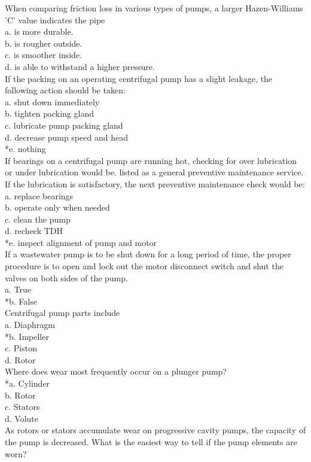 When comparing friction loss in various types of pumps, a larger Hazen-Williams 'C' value indicates the pipe\\
a. is more durable.\\
b. is rougher outside.\\
c. is smoother inside.\\
d. is able to withstand a higher pressure.\\
 If the packing on an operating centrifugal pump has a slight leakage, the following action should be taken: \\
a. shut down immediately \\
b. tighten packing gland \\
c. lubricate pump packing gland \\
d. decrease pump speed and head \\
*e. nothing \\
 If bearings on a centrifugal pump are running hot, checking for over lubrication or under lubrication would be. listed as a general preventive maintenance service. If the lubrication is satisfactory, the next preventive maintenance check would be: \\
a. replace bearings \\
b. operate only when needed \\
c. clean the pump \\
d. recheck TDH \\
*e. inspect alignment of pump and motor \\
 If a wastewater pump is to be shut down for a long period of time, the proper procedure is to open and lock out the motor disconnect switch and shut the valves on both sides of the pump. \\
a. True \\
*b. False \\
 Centrifugal pump parts include \\
a. Diaphragm \\
*b. Impeller \\
c. Piston \\
d. Rotor \\
 Where does wear most frequently occur on a plunger pump? \\
*a. Cylinder \\
b. Rotor \\
c. Stators \\
d. Volute\\
 As rotors or stators accumulate wear on progressive cavity pumps, the capacity of the pump is decreased. What is the easiest way to tell if the pump elements are worn? \\
